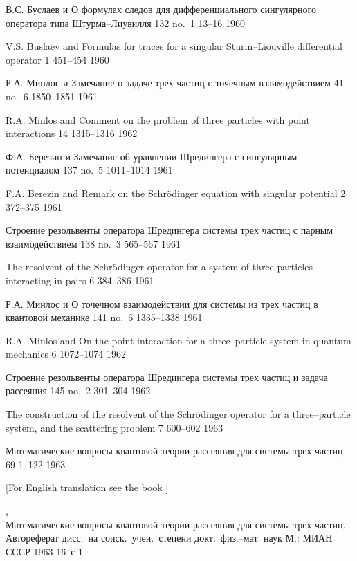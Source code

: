 {В.С. Буслаев и \LD}
{О формулах следов для
дифференциального сингулярного оператора типа Штурма--Лиувилля}
{\DAN} {132} {no.~1} {13--16} {1960}

{V.S. Buslaev and \LF} {Formulas for traces for a singular
Sturm--Liouville differential operator}
{\SMD} {1}  {451--454} {1960}

{Р.А. Минлос и \LD}
{Замечание о задаче трех частиц с точечным взаимодействием}
{\ZETF} {41} {no.~6} {1850--1851} {1961}

{R.A. Minlos and \LF}
{Comment on the problem of three particles with point interactions}
{\JETP} {14}  {1315--1316} {1962}

{Ф.А. Березин и \LD}
{Замечание об уравнении Шредингера с сингулярным потенциалом}
{\DAN} {137} {no.~5} {1011--1014} {1961}

{F.A. Berezin and \LF}
{Remark on the Schr\"odinger equation with singular potential}
{\SMD} {2} {372--375} {1961}

{\LD}
{Строение резольвенты оператора Шредингера системы трех
 частиц с парным взаимодействием}
{\DAN} {138} {no.~3} {565--567} {1961}

{\LF}
{The resolvent of the Schr\"odinger operator for a system of three
  particles interacting in pairs}
{\SPD} {6} {384--386} {1961}

{Р.А. Минлос и \LD}
{О точечном взаимодействии для системы из трех частиц в квантовой механике}
{\DAN} {141} {no.~6} {1335--1338} {1961}

{R.A. Minlos and \LF}
{On the point interaction for a three--particle system in quantum
  mechanics}
{\SPD} {6} {1072--1074} {1962}

{\LD}
{Строение резольвенты оператора Шредингера системы трех частиц и
задача рассеяния}
{\DAN} {145} {no.~2} {301--304} {1962}

{\LF}
{The construction of the resolvent of the Schr\"odinger operator for
  a three--particle system, and the scattering problem}
{\SPD} {7}  {600--602} {1963}

{\LD}
{Математические вопросы квантовой теории рассеяния для системы трех частиц}
{\Trudy} {69} {} {1--122} {1963}

[For English translation see the book \cite{b1963a}] 

{\LD,}\\
{Математические вопросы квантовой теории рассеяния для системы трех частиц.}
{Автореферат дисс.\ на соиск.\ учен.\ степени докт.\ физ.--мат. наук}
{М.: МИАН СССР} {} {1963} {} {16~с} {1}

